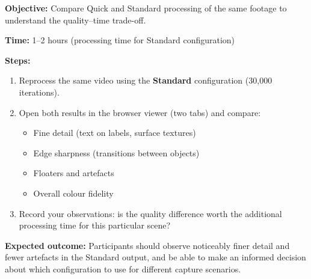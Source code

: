 \begin{tcolorbox}[
  enhanced,
  colback=SuccessGreen!8,
  colframe=SuccessGreen,
  fonttitle=\bfseries\sffamily,
  title={Exercise 2.2: Quality Comparison},
  sharp corners=south,
  boxrule=0.6pt
]
\textbf{Objective:} Compare Quick and Standard processing of the same footage to understand the quality--time trade-off.

\textbf{Time:} 1--2 hours (processing time for Standard configuration)

\textbf{Steps:}
\begin{enumerate}
  \item Reprocess the same video using the \textbf{Standard} configuration (30,000 iterations).
  \item Open both results in the browser viewer (two tabs) and compare:
    \begin{itemize}
      \item Fine detail (text on labels, surface textures)
      \item Edge sharpness (transitions between objects)
      \item Floaters and artefacts
      \item Overall colour fidelity
    \end{itemize}
  \item Record your observations: is the quality difference worth the additional processing time for this particular scene?
\end{enumerate}

\textbf{Expected outcome:} Participants should observe noticeably finer detail and fewer artefacts in the Standard output, and be able to make an informed decision about which configuration to use for different capture scenarios.
\end{tcolorbox}
